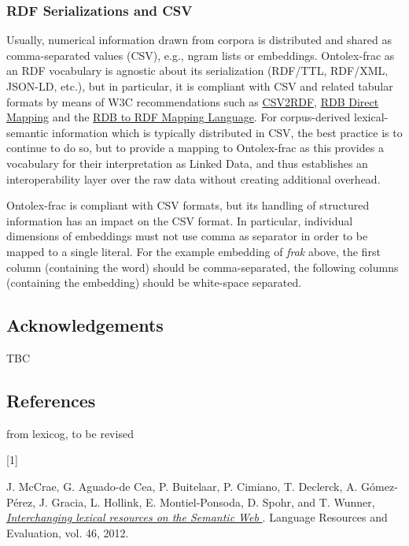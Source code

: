 \documentclass[a4paper]{article}
\newcommand\textstyleInternetlink[1]{\textcolor[rgb]{0.0,0.0,0.5019608}{#1}}
\newcommand\textstyleCitation[1]{\textit{#1}}
\begin{document}
\subsubsection{RDF Serializations and CSV}
Usually, numerical information drawn from corpora is distributed and shared as comma-separated values (CSV), e.g., ngram lists or embeddings. Ontolex-frac as an RDF vocabulary is agnostic about its serialization (RDF/TTL, RDF/XML, JSON-LD, etc.), but in particular, it is compliant with CSV and related tabular formats by means of W3C recommendations such as \href{https://www.w3.org/TR/csv2rdf/}{\textstyleInternetlink{CSV2RDF}}, \href{https://www.w3.org/TR/rdb-direct-mapping/}{\textstyleInternetlink{RDB Direct Mapping}} and the \href{https://www.w3.org/TR/r2rml/}{\textstyleInternetlink{RDB to RDF Mapping Language}}. For corpus-derived lexical-semantic information which is typically distributed in CSV, the best practice is to continue to do so, but to provide a mapping to Ontolex-frac as this provides a vocabulary for their interpretation as Linked Data, and thus establishes an interoperability layer over the raw data without creating additional overhead.

Ontolex-frac is compliant with CSV formats, but its handling of structured information has an impact on the CSV format. In particular, individual dimensions of embeddings must not use comma as separator in order to be mapped to a single literal. For the example embedding of \textit{frak} above, the first column (containing the word) should be comma-separated, the following columns (containing the embedding) should be white-space separated. 

\subsection{Acknowledgements}
TBC 

\subsection{References}
from lexicog, to be revised

[1] 

J. McCrae, G. Aguado-de Cea, P. Buitelaar, P. Cimiano, T. Declerck, A. Gómez-Pérez, J. Gracia, L. Hollink, E. Montiel-Ponsoda, D. Spohr, and T. Wunner, \href{http://dx.doi.org/10.1007/s10579-012-9182-3}{\textstyleCitation{{\textquotedbl}Interchanging lexical resources on the Semantic Web{\textquotedbl} }}. Language Resources and Evaluation, vol. 46, 2012. 
\end{document}

